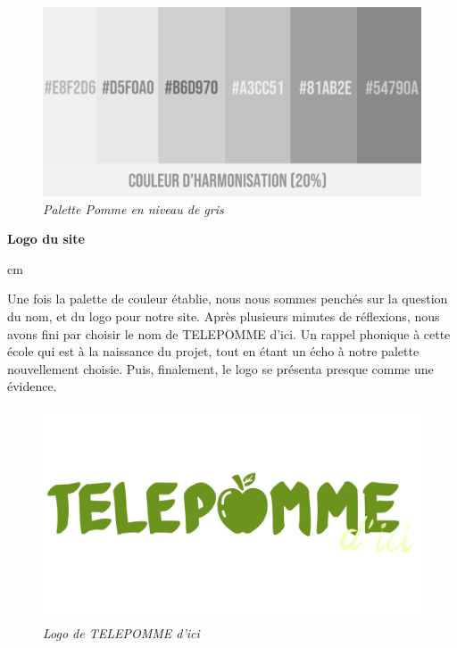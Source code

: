 \documentclass[12pt]{article}
\begin{document}
    \begin{figure}[h!]
        \centering
        \includegraphics[scale = 0.45]{static/greypal.png}
        \small{\emph{Palette Pomme en niveau de gris}}
        \label{fig:Palette2}
    \end{figure}


    \newpage


    \begin{large}
        \textbf{Logo du site}
    \end{large}

     cm

    Une fois la palette de couleur établie, nous nous sommes penchés sur la question du nom, et du logo pour notre site. Après plusieurs minutes de réflexions, nous avons fini par choisir le nom de TELEPOMME d'ici. Un rappel phonique à cette école qui est à la naissance du projet, tout en étant un écho à notre palette nouvellement choisie. Puis, finalement, le logo se présenta presque comme une évidence.

    \begin{figure}[h!]
        \centering
        \includegraphics[scale = 0.12]{static/Logo TELEPOMME d'ici.png}
        \small{\emph{Logo de TELEPOMME d'ici}}
        \label{fig:Logo}
    \end{figure}
\end{document}
